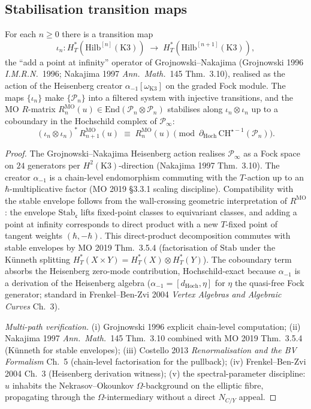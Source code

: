 \subsection{Stabilisation transition maps}
\label{subsec:modtr-stabilisation}

\begin{theorem}
\label{thm:modtr-gn-mo-compatibility}
For each $n\geq 0$ there is a transition map
\[
 \iota_n\colon H^*_T(\mathrm{Hilb}^{[n]}(\mathrm K3))
 \;\longrightarrow\;
 H^*_T(\mathrm{Hilb}^{[n+1]}(\mathrm K3)),
\]
the ``add a point at infinity'' operator of Grojnowski--Nakajima
(Grojnowski 1996 \emph{I.M.R.N.}~1996; Nakajima 1997
\emph{Ann.\ Math.}~145 Thm.~3.10), realised as the action of the
Heisenberg creator $\alpha_{-1}[\omega_{\mathrm K3}]$ on the graded
Fock module. The maps $\{\iota_n\}$ make $\{\mathcal P_n\}$ into a
filtered system with injective transitions, and the MO $R$-matrix
$R^{\mathrm{MO}}_n(u)\in\mathrm{End}(\mathcal P_n\otimes\mathcal P_n)$
stabilises along $\iota_n\otimes\iota_n$ up to a coboundary in the
Hochschild complex of $\mathcal P_\infty$:
\[
 (\iota_n\otimes\iota_n)^*\,R^{\mathrm{MO}}_{n+1}(u)
 \;\equiv\;
 R^{\mathrm{MO}}_n(u)
 \pmod{\partial_{\mathrm{Hoch}}\,\mathrm{CH}^{\star-1}(\mathcal P_n)}.
\]
\end{theorem}

\begin{proof}
The Grojnowski--Nakajima Heisenberg action realises $\mathcal P_\infty$
as a Fock space on $24$ generators per $H^2(\mathrm K3)$-direction
(Nakajima 1997 Thm.~3.10). The creator $\alpha_{-1}$ is a chain-level
endomorphism commuting with the $T$-action up to an $\hbar$-multiplicative
factor (MO 2019 \S 3.3.1 scaling discipline). Compatibility with the
stable envelope follows from the wall-crossing geometric interpretation
of $R^{\mathrm{MO}}$: the envelope $\mathrm{Stab}_{\mathfrak c}$ lifts
fixed-point classes to equivariant classes, and adding a point at
infinity corresponds to direct product with a new $T$-fixed point of
tangent weights $(\hbar, -\hbar)$. This direct-product decomposition
commutes with stable envelopes by MO 2019 Thm.~3.5.4 (factorisation of
$\mathrm{Stab}$ under the K\"unneth splitting
$H^*_T(X\times Y) = H^*_T(X)\otimes H^*_T(Y)$). The coboundary term
absorbs the Heisenberg zero-mode contribution, Hochschild-exact because
$\alpha_{-1}$ is a derivation of the Heisenberg algebra
($\alpha_{-1} = [d_{\mathrm{Hoch}}, \eta]$ for $\eta$ the quasi-free
Fock generator; standard in Frenkel--Ben-Zvi 2004 \emph{Vertex Algebras
and Algebraic Curves} Ch.~3).

\emph{Multi-path verification.}
(i) Grojnowski 1996 explicit chain-level computation;
(ii) Nakajima 1997 \emph{Ann.\ Math.}~145 Thm.~3.10 combined with
 MO 2019 Thm.~3.5.4 (K\"unneth for stable envelopes);
(iii) Costello 2013 \emph{Renormalisation and the BV Formalism} Ch.~5
 (chain-level factorisation for the pullback);
(iv) Frenkel--Ben-Zvi 2004 Ch.~3 (Heisenberg derivation witness);
(v) the spectral-parameter discipline: $u$ inhabits the
 Nekrasov--Okounkov $\Omega$-background on the elliptic fibre,
 propagating through the $\Omega$-intermediary without a direct
 $N_{C/Y}$ appeal.
\end{proof}

